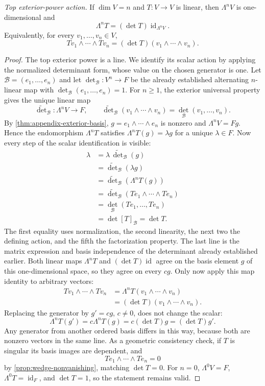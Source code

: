 \begin{theorem}
\label{thm:top-exterior-determinant}
\emph{Top exterior-power action.} If $\dim V=n$ and $T:V\to V$ is linear, then $\Lambda^nV$ is
one-dimensional and
\[
\Lambda^nT=(\det T)\operatorname{id}_{\Lambda^nV}.
\]
Equivalently, for every $v_1,\ldots,v_n\in V$,
\[
Tv_1\wedge\cdots\wedge Tv_n=(\det T)(v_1\wedge\cdots\wedge v_n).
\]
\end{theorem}
\begin{proof}
The top exterior power is a line. We identify its scalar action by applying
the normalized determinant form, whose value on the chosen generator is one.
Let $\mathcal B=(e_1,\ldots,e_n)$ and let
$\det_{\mathcal B}:V^n\to F$ be the already established alternating
$n$-linear map with $\det_{\mathcal B}(e_1,\ldots,e_n)=1$.
For $n\geq1$, the exterior universal property gives the unique linear map
\[
\widetilde{\det}_{\mathcal B}:\Lambda^nV\to F,\qquad
\widetilde{\det}_{\mathcal B}(v_1\wedge\cdots\wedge v_n)
=\det_{\mathcal B}(v_1,\ldots,v_n).
\]
By \cref{thm:appendix-exterior-basis}, $g=e_1\wedge\cdots\wedge e_n$
is nonzero and $\Lambda^nV=Fg$. Hence the endomorphism $\Lambda^nT$
satisfies $\Lambda^nT(g)=\lambda g$ for a unique $\lambda\in F$.
Now every step of the scalar identification is visible:
\[
\begin{aligned}
\lambda
&=\lambda\,\widetilde{\det}_{\mathcal B}(g)\\
&=\widetilde{\det}_{\mathcal B}(\lambda g)\\
&=\widetilde{\det}_{\mathcal B}(\Lambda^nT(g))\\
&=\widetilde{\det}_{\mathcal B}(Te_1\wedge\cdots\wedge Te_n)\\
&=\det_{\mathcal B}(Te_1,\ldots,Te_n)\\
&=\det[T]_{\mathcal B}=\det T.
\end{aligned}
\]
The first equality uses normalization, the second linearity, the next two
the defining action, and the fifth the factorization property. The last
line is the matrix expression and basis independence of the determinant
already established earlier. Both linear maps $\Lambda^nT$ and
$(\det T)\operatorname{id}$ agree on the basis element $g$ of this
one-dimensional space, so they agree on every $cg$. Only now apply this
map identity to arbitrary vectors:
\[
\begin{aligned}
Tv_1\wedge\cdots\wedge Tv_n
&=\Lambda^nT(v_1\wedge\cdots\wedge v_n)\\
&=(\det T)(v_1\wedge\cdots\wedge v_n).
\end{aligned}
\]
Replacing the generator by $g'=cg$, $c\ne0$, does not change the scalar:
\[
\Lambda^nT(g')=c\Lambda^nT(g)=c(\det T)g=(\det T)g'.
\]
Any generator from another ordered basis differs in this way, because
both are nonzero vectors in the same line. As a geometric consistency
check, if $T$ is singular its basis images are dependent, and
\[
Te_1\wedge\cdots\wedge Te_n=0
\]
by \cref{prop:wedge-nonvanishing}, matching $\det T=0$.
For $n=0$, $\Lambda^0V=F$, $\Lambda^0T=\operatorname{id}_F$, and
$\det T=1$, so the statement remains valid.
\end{proof}
